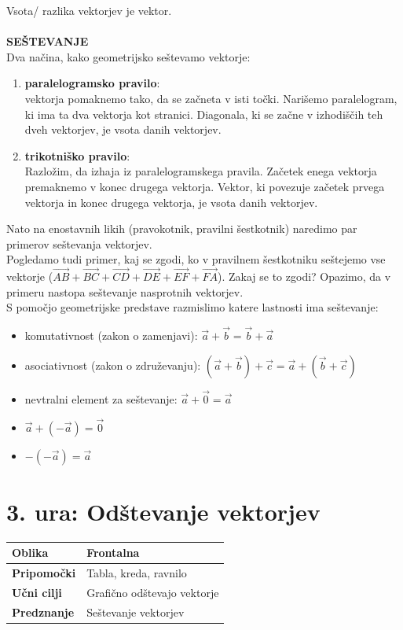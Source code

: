 \documentclass[a4paper,11pt]{article}
\begin{document}
Vsota/ razlika vektorjev je vektor.\\
\\
\textbf{SEŠTEVANJE}\\
Dva načina, kako geometrijsko seštevamo vektorje:
\begin{enumerate}
    \item \textbf{paralelogramsko pravilo}:\\
    vektorja pomaknemo tako, da se začneta v isti točki. Narišemo paralelogram, ki ima ta dva vektorja kot stranici. Diagonala, ki se začne v izhodiščih teh dveh vektorjev, je vsota danih vektorjev. 
    \item \textbf{trikotniško pravilo}:\\
    Razložim, da izhaja iz paralelogramskega pravila. Začetek enega vektorja premaknemo v konec drugega vektorja. Vektor, ki povezuje začetek prvega vektorja in konec drugega vektorja, je vsota danih vektorjev.
\end{enumerate}
Nato na enostavnih likih (pravokotnik, pravilni šestkotnik) naredimo par primerov seštevanja vektorjev.\\
Pogledamo tudi primer, kaj se zgodi, ko v pravilnem šestkotniku seštejemo vse vektorje ($\vec{AB}+\vec{BC}+\vec{CD}+\vec{DE}+\vec{EF}+\vec{FA}$). Zakaj se to zgodi? Opazimo, da v primeru nastopa seštevanje nasprotnih vektorjev.\\
S pomočjo geometrijske predstave razmislimo katere lastnosti ima seštevanje:
\begin{itemize}
    \item komutativnost (zakon o zamenjavi): $\vec{a}+\vec{b}=\vec{b}+\vec{a}$
    \item asociativnost (zakon o združevanju): $(\vec{a}+\vec{b})+\vec{c}=\vec{a}+(\vec{b}+\vec{c})$
    \item nevtralni element za seštevanje: $\vec{a}+\vec{0}=\vec{a}$
    \item $\vec{a}+(-\vec{a})=\vec{0}$
    \item $-(-\vec{a})=\vec{a}$
\end{itemize}
\newpage \section{3. ura: Odštevanje vektorjev}
\begin{tabularx}{\textwidth}{|>{\bfseries\RaggedRight}p{2.7cm}|X|}
\hline
Oblika & Frontalna \\ \hline
Pripomočki & Tabla, kreda, ravnilo \\ \hline
Učni cilji & Grafično odštevajo vektorje \\ \hline
Predznanje & Seštevanje vektorjev \\ \hline

\end{tabularx}
\end{document}
